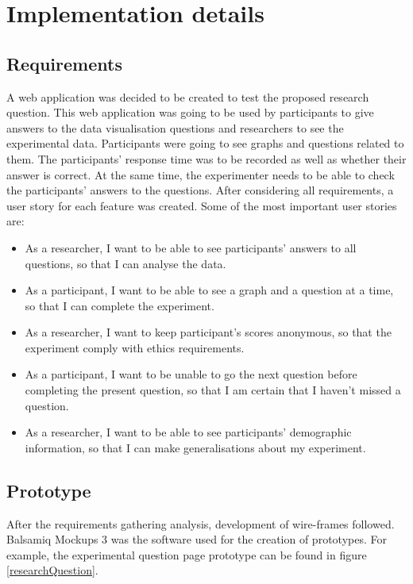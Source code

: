 \documentclass{l4proj}
\begin{document}
\chapter{Implementation details}

\section{Requirements}
\label{Requirements}

A web application was decided to be created to test the proposed research question. This web application was going to be used by participants to give answers to the data visualisation questions and researchers to see the experimental data. Participants were going to see graphs and questions related to them. The participants' response time was to be recorded as well as whether their answer is correct. At the same time, the experimenter needs to be able to check the participants' answers to the questions. After considering all requirements, a user story for each feature was created. Some of the most important user stories are:

\begin{itemize}
   \item As a researcher, I want to be able to see participants' answers to all questions, so that I can analyse the data.
   \item As a participant, I want to be able to see a graph and a question at a time, so that I can complete the experiment.
   \item As a researcher, I want to keep participant's scores anonymous, so that the experiment comply with ethics requirements.
   \item As a participant, I want to be unable to go the next question before completing the present question, so that I am certain that I haven't missed a question.
   \item As a researcher, I want to be able to see participants' demographic information, so that I can make generalisations about my experiment.
\end{itemize}

\section{Prototype}
After the requirements gathering analysis, development of wire-frames followed. Balsamiq Mockups 3 was the software used for the creation of prototypes. For example, the experimental question page prototype can be found in figure \ref{researchQuestion}.
\end{document}
